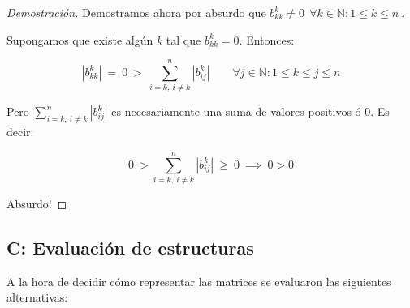 \begin{proof}[Demostración]
\vspace{2em}
\noindent Demostramos ahora por absurdo que $b^{k}_{kk} \neq 0\ \ \forall k \in \mathbb{N}: 1 \leq k \leq n\ $.

\vspace{1em}
\noindent Supongamos que existe algún $k$ tal que $b^{k}_{kk} = 0$. Entonces:

\begin{equation*}
    |b^{k}_{kk}| \ =\ 0\ >\ \sum_{i = k,\ i \neq k}^{n} |b^{k}_{ij}| \qquad \forall j \in \mathbb{N}: 1 \leq k \leq j \leq n
\end{equation*}

\vspace{1em}
\noindent Pero $\sum_{i = k,\ i \neq k}^{n} |b^{k}_{ij}|$ es necesariamente una suma de valores positivos ó $0$. Es decir: 

\begin{equation*}
    0\ > \sum_{i = k,\ i \neq k}^{n} |b^{k}_{ij}|\ \geq\ 0\ \implies\ 0 > 0
\end{equation*}

\vspace{1em}
\noindent Absurdo! 

\end{proof}
 



\newpage
\subsection{C: Evaluación de estructuras}\label{A.3}

A la hora de decidir cómo representar las matrices se evaluaron las siguientes alternativas:

